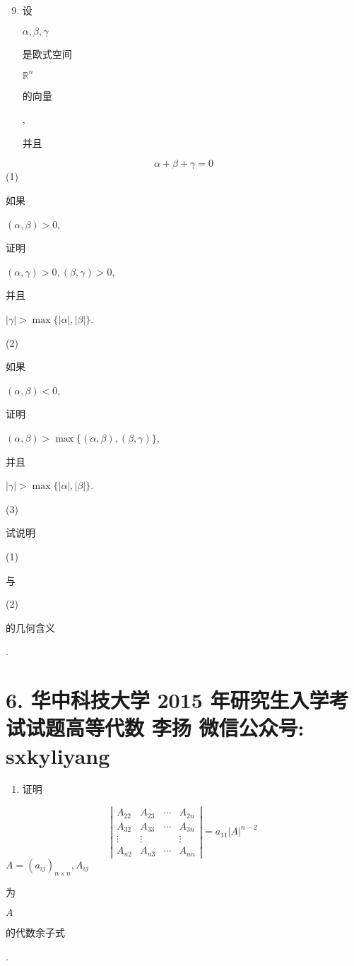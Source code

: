\documentclass[10pt]{article}
\begin{document}
\begin{enumerate}
  \setcounter{enumi}{8}
  \item \begin{CJK}{UTF8}{mj}设\end{CJK} $\alpha, \beta, \gamma$ \begin{CJK}{UTF8}{mj}是欧式空间\end{CJK} $\mathbb{R}^{n}$ \begin{CJK}{UTF8}{mj}的向量\end{CJK}, \begin{CJK}{UTF8}{mj}并且\end{CJK}
\end{enumerate}
$$
\alpha+\beta+\gamma=0
$$
(1) \begin{CJK}{UTF8}{mj}如果\end{CJK} $(\alpha, \beta)>0$, \begin{CJK}{UTF8}{mj}证明\end{CJK} $(\alpha, \gamma)>0,(\beta, \gamma)>0$, \begin{CJK}{UTF8}{mj}并且\end{CJK} $|\gamma|>\max \{|\alpha|,|\beta|\}$.

(2) \begin{CJK}{UTF8}{mj}如果\end{CJK} $(\alpha, \beta)<0$, \begin{CJK}{UTF8}{mj}证明\end{CJK} $(\alpha, \beta)>\max \{(\alpha, \beta),(\beta, \gamma)\}$, \begin{CJK}{UTF8}{mj}并且\end{CJK} $|\gamma|>\max \{|\alpha|,|\beta|\}$.

(3) \begin{CJK}{UTF8}{mj}试说明\end{CJK} (1) \begin{CJK}{UTF8}{mj}与\end{CJK} (2) \begin{CJK}{UTF8}{mj}的几何含义\end{CJK}.

\section{6. 华中科技大学 2015 年研究生入学考试试题高等代数 
 李扬 
 微信公众号: sxkyliyang}
\begin{enumerate}
  \item \begin{CJK}{UTF8}{mj}证明\end{CJK}
\end{enumerate}
$$
\left|\begin{array}{cccc}
A_{22} & A_{23} & \cdots & A_{2 n} \\
A_{32} & A_{33} & \cdots & A_{3 n} \\
\vdots & \vdots & & \vdots \\
A_{n 2} & A_{n 3} & \cdots & A_{n n}
\end{array}\right|=a_{11}|A|^{n-2}
$$
$A=\left(a_{i j}\right)_{n \times n}, A_{i j}$ \begin{CJK}{UTF8}{mj}为\end{CJK} $A$ \begin{CJK}{UTF8}{mj}的代数余子式\end{CJK}.
\end{document}
